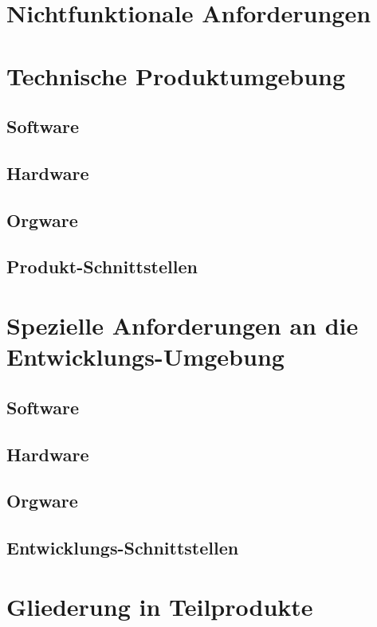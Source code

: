 \documentclass[12pt, a4paper]{article}
\begin{document}
\section{Nichtfunktionale Anforderungen}
\pagebreak

\section{Technische Produktumgebung}
\subsection{Software}
\subsection{Hardware}
\subsection{Orgware}
\subsection{Produkt-Schnittstellen}
\pagebreak

\section{Spezielle Anforderungen an die Entwicklungs-Umgebung}
\subsection{Software}
\subsection{Hardware}
\subsection{Orgware}
\subsection{Entwicklungs-Schnittstellen}
\pagebreak

\section{Gliederung in Teilprodukte}
\pagebreak
\end{document}
